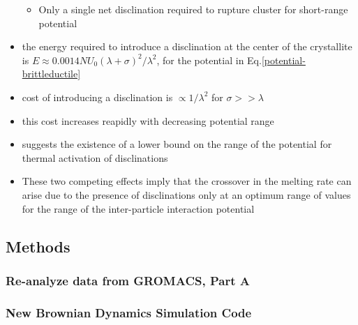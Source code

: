 \documentclass[11pt]{article}
\begin{document}
\begin{itemize}
\begin{itemize}
\item Only a single net disclination required to rupture cluster for short-range potential\\
\label{sec-3.1.5.8.5}

\end{itemize} %

\item the energy required to introduce a disclination at the center of the crystallite is $E \approx 0.0014 N U_0 (\lambda + \sigma)^2/\lambda^2$, for the potential in Eq.\ref{potential-brittleductile}\\
\label{sec-3.1.5.9}


\item cost of introducing a disclination is $\propto 1/\lambda^2$ for  $\sigma >> \lambda$\\
\label{sec-3.1.5.10}


\item this cost increases reapidly with decreasing potential range\\
\label{sec-3.1.5.11}


\item suggests the existence of a lower bound on the range of the potential for thermal activation of disclinations\\
\label{sec-3.1.5.12}


\item These two competing effects imply that the crossover in the melting rate can arise due to the presence of disclinations only at an optimum range of values for the range of the inter-particle interaction potential\\
\label{sec-3.1.5.13}


\end{itemize} %
\subsection{Methods}
\label{sec-3.2}

\subsubsection{Re-analyze data from GROMACS, Part A}
\label{sec-3.2.1}

\subsubsection{New Brownian Dynamics Simulation Code}
\label{sec-3.2.2}
\end{document}
